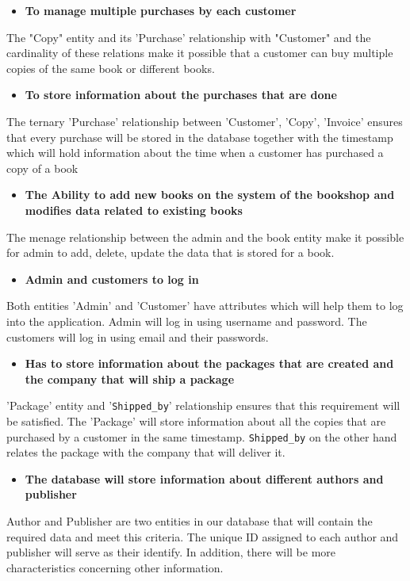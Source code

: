 \begin{itemize}
\item \textbf{To manage multiple purchases by each customer} 
\end{itemize}
The "Copy" entity and its 'Purchase' relationship with "Customer" and the cardinality of these relations make it possible that a customer can buy multiple copies of the same book or different books.

\begin{itemize}
\item \textbf{To store information about the purchases that are done}
\end{itemize}
The ternary 'Purchase' relationship between 'Customer', 'Copy', 'Invoice' ensures that every purchase will be stored in the database together with the timestamp which will hold information about the time when a customer has purchased a copy of a book

\begin{itemize}
\item \textbf{The Ability to add new books on the system of the bookshop and modifies data related to existing books}
\end{itemize}
The menage relationship between the admin and the book entity make it possible for admin to add, delete, update the data that is stored for a book.

\begin{itemize}
\item \textbf{Admin and customers to log in}
\end{itemize}
Both entities 'Admin' and 'Customer' have attributes which will help them to log into the application. Admin will log in using username and password. The customers will log in using email and their passwords.    

\begin{itemize}
\item \textbf{Has to store information about the packages that are created and the company that will ship a package }
\end{itemize}
'Package' entity and '\texttt{Shipped\_by}' relationship ensures that this requirement will be satisfied. The 'Package' will store information about all the copies that are purchased by a customer in the same timestamp. \texttt{Shipped\_by} on the other hand relates the package with the company that will deliver it. 

\begin{itemize}
\item \textbf{The database will store information about different authors and publisher}
\end{itemize}
Author and Publisher are two entities in our database that will contain the required data and meet this criteria. The unique ID assigned to each author and publisher will serve as their identify. In addition, there will be more characteristics concerning other information.